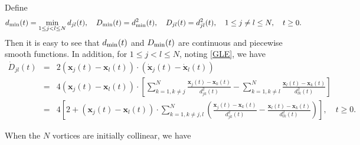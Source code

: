 \documentclass{aims}
\theoremstyle{plain}
\theoremstyle{definition}
\newcommand{\bx}{{\mathbf x}}
\newcommand{\nn}{\nonumber}
\newcommand{\be} {\begin{equation}}
\newcommand{\ee}{\end{equation}}
\newcommand{\bea}{\begin{eqnarray}}
\newcommand{\eea}{\end{eqnarray} }
\begin{document}
  Define
\be\label{dmin11}
d_{\rm min}(t)=\min_{1\leq j<l\leq N}d_{jl}(t),\quad D_{\rm min}(t)=d_{\rm min}^2(t), \quad D_{jl}(t)=d_{jl}^2(t), \quad 1\le j\ne l\le N,\quad t\ge0.
\ee
Then it is easy to see that $d_{\rm min}(t)$ and $D_{\rm min}(t)$ are continuous and piecewise smooth functions. In addition, for $1\le j<l\le N$, noting \eqref{GLE}, we have
\bea\label{Djlt1}
\dot D_{jl}(t)
&=&2(\mathbf
x_j(t)-\mathbf x_l(t))\cdot(\dot{\mathbf x}_j(t)-\dot {\mathbf x}_l(t))\nn\\
&=&4(\mathbf
x_j(t)-\mathbf x_l(t))\cdot\left[\sum_{k=1,k\ne j}^N \frac{\bx_j(t)-\bx_k(t)} {d_{jk}^2(t)}-\sum_{k=1,k\ne l}^N  \frac{\bx_l(t)-\bx_k(t)} {d_{lk}^2(t)}\right]\nn\\
&=&4\left[2+(\mathbf
x_j(t)-\mathbf x_l(t))\cdot\sum_{k=1,k\ne j,l}^N\left(\frac{\bx_j(t)-\bx_k(t)} {d_{jk}^2(t)}-
\frac{\bx_l(t)-\bx_k(t)} {d_{lk}^2(t)}\right)\right], \quad t\ge0.\quad
\eea


When the $N$ vortices are initially collinear,
we have
\end{document}
